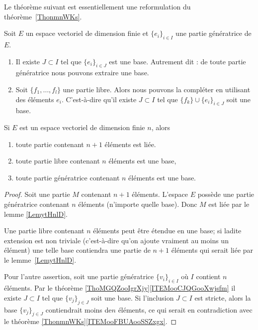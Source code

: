 Le théorème suivant est essentiellement une reformulation du théorème~\ref{ThonmnWKs}.
\begin{theorem} \label{ThoMGQZooIgrXjy}
    Soit \( E\) un espace vectoriel de dimension finie et \( \{ e_i \}_{i\in I}\) une partie génératrice de \( E\).

    \begin{enumerate}
        \item       \label{ITEMooTZUDooFEgymQ}
            Il existe \( J\subset I\) tel que \( \{ e_i \}_{i\in J}\) est une base. Autrement dit : de toute partie génératrice nous pouvons extraire une base.
        \item       \label{ITEMooCJQGooXwjsfm}
            Soit \( \{ f_1,\ldots, f_l \}\) une partie libre. Alors nous pouvons la compléter en utilisant des éléments \( e_i\). C'est-à-dire qu'il existe \( J\subset I\) tel que \( \{ f_k \}\cup\{ e_i \}_{i\in J}\) soit une base.
    \end{enumerate}
\end{theorem}

\begin{proposition}     \label{PROPooVEVCooHkrldw}
    Si \( E\) est un espace vectoriel de dimension finie \( n\), alors 
    \begin{enumerate}
        \item       \label{ITEMooZNLDooBISkJyBS}
            toute partie contenant \( n+1\) éléments est liée.
        \item       \label{ITEMooSGGCooOUsuBs}
            toute partie libre contenant \( n\) éléments est une base,
        \item
            toute partie génératrice contenant \( n\) éléments est une base.
    \end{enumerate}
\end{proposition}

\begin{proof}
    Soit une partie \( M\) contenant \( n+1\) éléments. L'espace \( E\) possède une partie génératrice contenant \( n\) éléments (n'importe quelle base). Donc \( M\) est liée par le lemme \ref{LemytHnlD}.

    Une partie libre contenant \( n\) éléments peut être étendue en une base; si ladite extension est non triviale (c'est-à-dire qu'on ajoute vraiment au moins un élément) une telle base contiendra une partie de \( n+1\) éléments qui serait liée par le lemme~\ref{LemytHnlD}.

    Pour l'autre assertion, soit une partie génératrice \( \{ v_i \}_{i\in I}\) où \( I\) contient \( n\) éléments. Par le théorème \ref{ThoMGQZooIgrXjy}\ref{ITEMooCJQGooXwjsfm} il existe \( J\subset I\) tel que \( \{ v_j \}_{j\in J}\) soit une base. Si l'inclusion \( J\subset I\) est stricte, alors la base \( \{ v_j \}_{j\in J}\) contiendrait moins de\( n\) éléments, ce qui serait en contradiction avec le théorème \ref{ThonmnWKs}\ref{ITEMooFBUAooSSZxgx}.
\end{proof}

